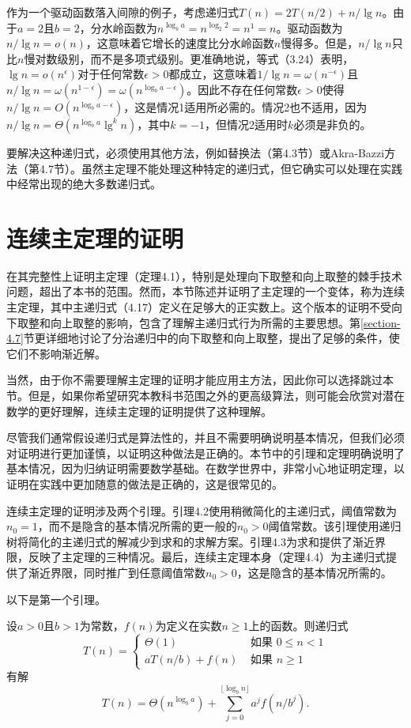 \documentclass[lang=cn,newtx,10pt,scheme=chinese]{elegantbook}
\begin{document}
作为一个驱动函数落入间隙的例子，考虑递归式$T(n)=2T(n/2)+n/\lg n$。由于$a=2$且$b=2$，分水岭函数为$n^{\log _b a}=n^{\log _2 2}=n^1=n$。驱动函数为$n / \lg n=o(n)$，这意味着它增长的速度比分水岭函数$n$慢得多。但是，$n / \lg n$只比$n$慢对数级别，而不是多项式级别。更准确地说，等式（3.24）表明，$\lg n=o(n^\epsilon)$对于任何常数$\epsilon>0$都成立，这意味着$1 / \lg n=\omega(n^{-\epsilon})$且$n / \lg n=\omega(n^{1-\epsilon})=\omega(n^{\log _b a-\epsilon})$。因此不存在任何常数$\epsilon>0$使得$n / \lg n=O(n^{\log _b a-\epsilon})$，这是情况1适用所必需的。情况2也不适用，因为$n / \lg n=\Theta(n^{\log _b a} \lg ^k n)$，其中$k=-1$，但情况2适用时$k$必须是非负的。

要解决这种递归式，必须使用其他方法，例如替换法（第4.3节）或Akra-Bazzi方法（第4.7节）。虽然主定理不能处理这种特定的递归式，但它确实可以处理在实践中经常出现的绝大多数递归式。

\section{连续主定理的证明}\label{section-4.6}

在其完整性上证明主定理（定理4.1），特别是处理向下取整和向上取整的棘手技术问题，超出了本书的范围。然而，本节陈述并证明了主定理的一个变体，称为连续主定理，其中主递归式（4.17）定义在足够大的正实数上。这个版本的证明不受向下取整和向上取整的影响，包含了理解主递归式行为所需的主要思想。第\ref{section-4.7}节更详细地讨论了分治递归中的向下取整和向上取整，提出了足够的条件，使它们不影响渐近解。

当然，由于你不需要理解主定理的证明才能应用主方法，因此你可以选择跳过本节。但是，如果你希望研究本教科书范围之外的更高级算法，则可能会欣赏对潜在数学的更好理解，连续主定理的证明提供了这种理解。

尽管我们通常假设递归式是算法性的，并且不需要明确说明基本情况，但我们必须对证明进行更加谨慎，以证明这种做法是正确的。本节中的引理和定理明确说明了基本情况，因为归纳证明需要数学基础。在数学世界中，非常小心地证明定理，以证明在实践中更加随意的做法是正确的，这是很常见的。

连续主定理的证明涉及两个引理。引理4.2使用稍微简化的主递归式，阈值常数为$n_0=1$，而不是隐含的基本情况所需的更一般的$n_0>0$阈值常数。该引理使用递归树将简化的主递归式的解减少到求和的求解方案。引理4.3为求和提供了渐近界限，反映了主定理的三种情况。最后，连续主定理本身（定理4.4）为主递归式提供了渐近界限，同时推广到任意阈值常数$n_0>0$，这是隐含的基本情况所需的。

以下是第一个引理。

\begin{lemma}{}{}
设$a>0$且$b>1$为常数，$f(n)$为定义在实数$n \geq 1$上的函数。则递归式
$$
T(n)= \begin{cases}\Theta(1) & \text { 如果 } 0 \leq n<1 \\ a T(n / b)+f(n) & \text { 如果 } n \geq 1\end{cases}
$$
有解
$$
T(n)=\Theta(n^{\log _b a})+\sum_{j=0}^{\lfloor\log _b n\rfloor} a^j f(n/b^j) .
$$
\end{lemma}
\end{document}
